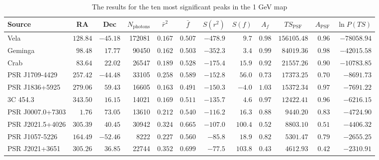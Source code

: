 \documentclass[useAMS,usenatbib]{mn2e}
\begin{document}
\begin{table}
  \caption{The results for the ten most significant peaks in the 1 GeV map}
\label{tab:topten}
  \begin{tabular}{l|rrrrrrrrrrr}
    \hline
    Source & \multicolumn{1}{c}{RA} & \multicolumn{1}{c}{Dec}  & \multicolumn{1}{c}{$N_\mathrm{photons}$}  & \multicolumn{1}{c}{$\bar r^2$} & \multicolumn{1}{c}{$\bar f$} & \multicolumn{1}{c}{$S(r^2)$} & \multicolumn{1}{c}{$S(f)$} & \multicolumn{1}{c}{$A_f$} & \multicolumn{1}{c}{$TS_\mathrm{PSF}$} & \multicolumn{1}{c}{$A_\mathrm{PSF}$} &
    \multicolumn{1}{c}{$\ln P(TS)$} \\
    \hline

Vela             & $128.84$ & $-45.18$ & 172081 & $0.167$ & $0.507$ & $-478.9$ & $   9.7$ & $0.98$ & $156105.48$ & $0.96$ & $-78058.94$ \\ 
Geminga          & $ 98.48$ & $ 17.77$ &  90450 & $0.162$ & $0.503$ & $-352.3$ & $   3.4$ & $0.99$ & $ 84019.36$ & $0.98$ & $-42015.58$ \\ 
Crab             & $ 83.64$ & $ 22.02$ &  26547 & $0.189$ & $0.528$ & $-175.4$ & $  15.9$ & $0.92$ & $ 21557.26$ & $0.90$ & $-10783.85$ \\ 
PSR J1709-4429   & $257.42$ & $-44.48$ &  33105 & $0.258$ & $0.589$ & $-152.8$ & $  56.0$ & $0.73$ & $ 17373.25$ & $0.70$ & $ -8691.73$ \\ 
PSR J1836+5925   & $279.06$ & $ 59.43$ &  16605 & $0.163$ & $0.491$ & $-150.3$ & $  -4.0$ & $1.03$ & $ 15372.34$ & $0.97$ & $ -7691.22$ \\ 
3C 454.3	 & $343.50$ & $ 16.15$ &  14021 & $0.169$ & $0.511$ & $-135.7$ & $   4.6$ & $0.97$ & $ 12422.41$ & $0.96$ & $ -6216.15$ \\ 
PSR J0007.0+7303 & $  1.76$ & $ 73.05$ &  13610 & $0.212$ & $0.540$ & $-116.2$ & $  16.3$ & $0.88$ & $  9440.20$ & $0.83$ & $ -4724.90$ \\ 
PSR J2021.5+4026 & $305.39$ & $ 40.45$ &  30942 & $0.324$ & $0.665$ & $-107.0$ & $ 100.4$ & $0.52$ & $  8803.10$ & $0.51$ & $ -4406.32$ \\ 
PSR J1057-5226   & $164.49$ & $-52.46$ &   8222 & $0.227$ & $0.560$ & $ -85.8$ & $  18.9$ & $0.82$ & $  5301.47$ & $0.79$ & $ -2655.25$ \\ 
PSR J2021+3651	 & $305.26$ & $ 36.85$ &  22744 & $0.352$ & $0.699$ & $ -77.5$ & $ 103.8$ & $0.43$ & $  4612.93$ & $0.42$ & $ -2310.91$ \\ 
\end{tabular}
\end{table}
\end{document}

